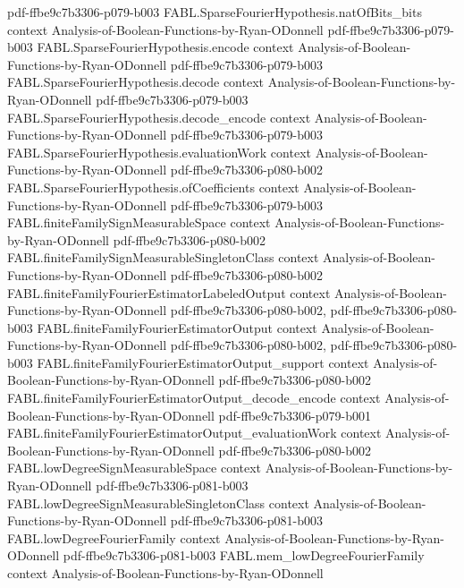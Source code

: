 \begin{theorem}
  {pdf-ffbe9c7b3306-p079-b003}
\proofstep
  {FABL.SparseFourierHypothesis.natOfBits_bits}
  {context}
  {Analysis-of-Boolean-Functions-by-Ryan-ODonnell}
  {pdf-ffbe9c7b3306-p079-b003}
\proofstep
  {FABL.SparseFourierHypothesis.encode}
  {context}
  {Analysis-of-Boolean-Functions-by-Ryan-ODonnell}
  {pdf-ffbe9c7b3306-p079-b003}
\proofstep
  {FABL.SparseFourierHypothesis.decode}
  {context}
  {Analysis-of-Boolean-Functions-by-Ryan-ODonnell}
  {pdf-ffbe9c7b3306-p079-b003}
\proofstep
  {FABL.SparseFourierHypothesis.decode_encode}
  {context}
  {Analysis-of-Boolean-Functions-by-Ryan-ODonnell}
  {pdf-ffbe9c7b3306-p079-b003}
\proofstep
  {FABL.SparseFourierHypothesis.evaluationWork}
  {context}
  {Analysis-of-Boolean-Functions-by-Ryan-ODonnell}
  {pdf-ffbe9c7b3306-p080-b002}
\proofstep
  {FABL.SparseFourierHypothesis.ofCoefficients}
  {context}
  {Analysis-of-Boolean-Functions-by-Ryan-ODonnell}
  {pdf-ffbe9c7b3306-p079-b003}
\proofstep
  {FABL.finiteFamilySignMeasurableSpace}
  {context}
  {Analysis-of-Boolean-Functions-by-Ryan-ODonnell}
  {pdf-ffbe9c7b3306-p080-b002}
\proofstep
  {FABL.finiteFamilySignMeasurableSingletonClass}
  {context}
  {Analysis-of-Boolean-Functions-by-Ryan-ODonnell}
  {pdf-ffbe9c7b3306-p080-b002}
\proofstep
  {FABL.finiteFamilyFourierEstimatorLabeledOutput}
  {context}
  {Analysis-of-Boolean-Functions-by-Ryan-ODonnell}
  {pdf-ffbe9c7b3306-p080-b002,
    pdf-ffbe9c7b3306-p080-b003}
\proofstep
  {FABL.finiteFamilyFourierEstimatorOutput}
  {context}
  {Analysis-of-Boolean-Functions-by-Ryan-ODonnell}
  {pdf-ffbe9c7b3306-p080-b002,
    pdf-ffbe9c7b3306-p080-b003}
\proofstep
  {FABL.finiteFamilyFourierEstimatorOutput_support}
  {context}
  {Analysis-of-Boolean-Functions-by-Ryan-ODonnell}
  {pdf-ffbe9c7b3306-p080-b002}
\proofstep
  {FABL.finiteFamilyFourierEstimatorOutput_decode_encode}
  {context}
  {Analysis-of-Boolean-Functions-by-Ryan-ODonnell}
  {pdf-ffbe9c7b3306-p079-b001}
\proofstep
  {FABL.finiteFamilyFourierEstimatorOutput_evaluationWork}
  {context}
  {Analysis-of-Boolean-Functions-by-Ryan-ODonnell}
  {pdf-ffbe9c7b3306-p080-b002}
\proofstep
  {FABL.lowDegreeSignMeasurableSpace}
  {context}
  {Analysis-of-Boolean-Functions-by-Ryan-ODonnell}
  {pdf-ffbe9c7b3306-p081-b003}
\proofstep
  {FABL.lowDegreeSignMeasurableSingletonClass}
  {context}
  {Analysis-of-Boolean-Functions-by-Ryan-ODonnell}
  {pdf-ffbe9c7b3306-p081-b003}
\proofstep
  {FABL.lowDegreeFourierFamily}
  {context}
  {Analysis-of-Boolean-Functions-by-Ryan-ODonnell}
  {pdf-ffbe9c7b3306-p081-b003}
\proofstep
  {FABL.mem_lowDegreeFourierFamily}
  {context}
  {Analysis-of-Boolean-Functions-by-Ryan-ODonnell}

\end{theorem}
